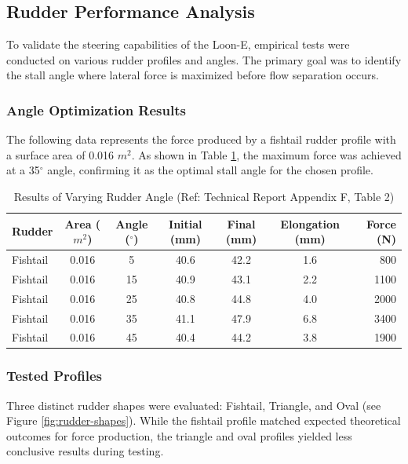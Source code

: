 \subsection{Rudder Performance Analysis}
\label{subsec:rudder-performance}

To validate the steering capabilities of the Loon-E, empirical tests were conducted on various rudder profiles and angles. The primary goal was to identify the stall angle where lateral force is maximized before flow separation occurs.

\subsubsection{Angle Optimization Results}
The following data represents the force produced by a fishtail rudder profile with a surface area of 0.016 $m^2$. As shown in Table \ref{tab:rudder-angle-results}, the maximum force was achieved at a 35$^{\circ}$ angle, confirming it as the optimal stall angle for the chosen profile.

\begin{table}[H]
    \centering
    \begin{tabular}{|l|c|c|c|c|c|r|}
        \hline
        \textbf{Rudder} & \textbf{Area ($m^2$)} & \textbf{Angle ($^\circ$)} & \textbf{Initial (mm)} & \textbf{Final (mm)} & \textbf{Elongation (mm)} & \textbf{Force (N)} \\
        \hline
        Fishtail & 0.016 & 5  & 40.6 & 42.2 & 1.6 & 800 \\
        Fishtail & 0.016 & 15 & 40.9 & 43.1 & 2.2 & 1100 \\
        Fishtail & 0.016 & 25 & 40.8 & 44.8 & 4.0 & 2000 \\
        Fishtail & 0.016 & 35 & 41.1 & 47.9 & 6.8 & 3400 \\
        Fishtail & 0.016 & 45 & 40.4 & 44.2 & 3.8 & 1900 \\
        \hline
    \end{tabular}
    \caption{Results of Varying Rudder Angle (Ref: Technical Report Appendix F, Table 2)}
    \label{tab:rudder-angle-results}
\end{table}

\subsubsection{Tested Profiles}
Three distinct rudder shapes were evaluated: Fishtail, Triangle, and Oval (see Figure \ref{fig:rudder-shapes}). While the fishtail profile matched expected theoretical outcomes for force production, the triangle and oval profiles yielded less conclusive results during testing.

